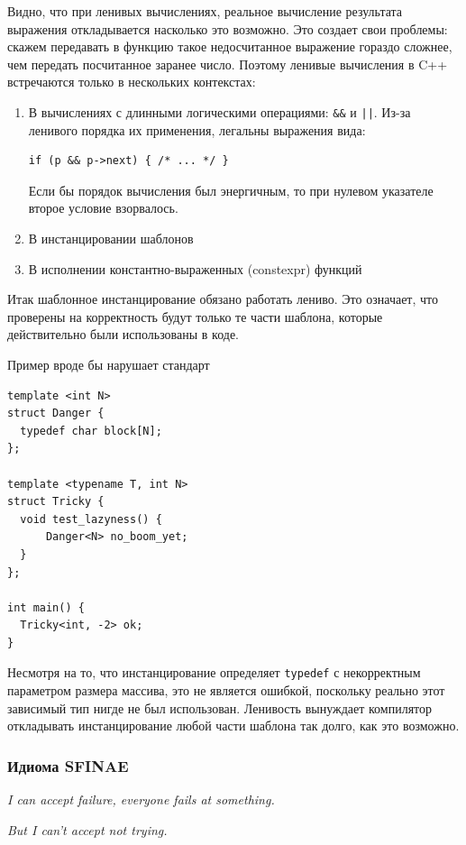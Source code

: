 \documentclass[a4paper,12pt,oneside]{article}
\begin{document}
Видно, что при ленивых вычислениях, реальное вычисление результата выражения откладывается насколько это возможно. Это создает свои проблемы: скажем передавать в функцию такое недосчитанное выражение гораздо сложнее, чем передать посчитанное заранее число. Поэтому ленивые вычисления в C++ встречаются только в нескольких контекстах:

\begin{enumerate}
\item В вычислениях с длинными логическими операциями: \lstinline!&&! и \lstinline!||!. Из-за ленивого порядка их применения, легальны выражения вида:
\begin{lstlisting}
if (p && p->next) { /* ... */ }
\end{lstlisting}
Если бы порядок вычисления был энергичным, то при нулевом указателе второе условие взорвалось.
\item В инстанцировании шаблонов
\item В исполнении константно-выраженных (constexpr) функций
\end{enumerate}

Итак шаблонное инстанцирование обязано работать лениво. Это означает, что проверены на корректность будут только те части шаблона, которые действительно были использованы в коде.

Пример вроде бы нарушает стандарт

\begin{lstlisting}
template <int N>
struct Danger {
  typedef char block[N]; 
};

template <typename T, int N>
struct Tricky {
  void test_lazyness() {
      Danger<N> no_boom_yet;
  }
};

int main() {
  Tricky<int, -2> ok;
}
\end{lstlisting}

Несмотря на то, что инстанцирование определяет \lstinline!typedef! с некорректным параметром размера массива, это не является ошибкой, поскольку реально этот зависимый тип нигде не был использован. Ленивость вынуждает компилятор откладывать инстанцирование любой части шаблона так долго, как это возможно.

\pagebreak
\subsubsection{Идиома SFINAE}\label{SFINAE}

\hfill\textit{I can accept failure, everyone fails at something.}

\hfill\textit{But I can't accept not trying.}{\vspace{0.5em}}
\end{document}
